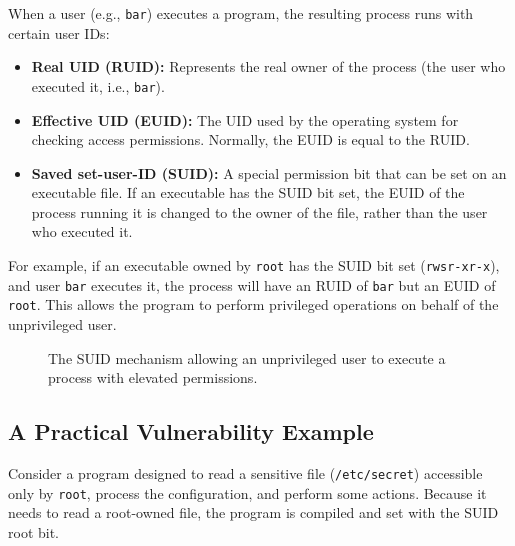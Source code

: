 When a user (e.g., \texttt{bar}) executes a program, the resulting process runs with certain user IDs:
\begin{itemize}
    \item \textbf{Real UID (RUID):} Represents the real owner of the process (the user who executed it, i.e., \texttt{bar}).
    \item \textbf{Effective UID (EUID):} The UID used by the operating system for checking access permissions. Normally, the EUID is equal to the RUID.
    \item \textbf{Saved set-user-ID (SUID):} A special permission bit that can be set on an executable file. If an executable has the SUID bit set, the EUID of the process running it is changed to the owner of the file, rather than the user who executed it.
\end{itemize}

For example, if an executable owned by \texttt{root} has the SUID bit set (\texttt{rwsr-xr-x}), and user \texttt{bar} executes it, the process will have an RUID of \texttt{bar} but an EUID of \texttt{root}. This allows the program to perform privileged operations on behalf of the unprivileged user.

\begin{figure}[hbtp]
\centering
{}
\caption{The SUID mechanism allowing an unprivileged user to execute a process with elevated permissions.}
\end{figure}

\subsection{A Practical Vulnerability Example}
Consider a program designed to read a sensitive file (\texttt{/etc/secret}) accessible only by \texttt{root}, process the configuration, and perform some actions. Because it needs to read a root-owned file, the program is compiled and set with the SUID root bit.

